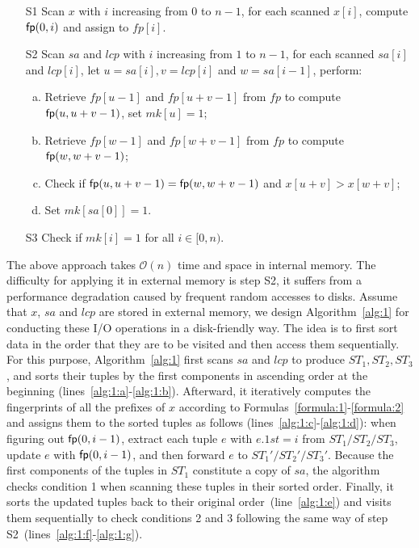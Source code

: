 \documentclass[10pt,journal,compsoc]{IEEEtran}
\begin{document}
\begin{enumerate}
	\item [S1]
	Scan $x$ with $i$ increasing from $0$ to $n - 1$, for each scanned $x[i]$, compute ${\sf fp}(0, i)$ and assign to $fp[i]$.
	
	\item [S2]
	Scan $sa$ and $lcp$ with $i$ increasing from $1$ to $n - 1$, for each scanned $sa[i]$ and $lcp[i]$, let $u = sa[i], v = lcp[i]$ and $w = sa[i - 1]$, perform:
	
	\begin{enumerate}[(a)]
		\item
		Retrieve $fp[u - 1]$ and $fp[u + v - 1]$ from $fp$ to compute ${\sf fp}(u, u + v - 1)$, set $mk[u]=1$;
		
		\item
		Retrieve $fp[w - 1]$ and $fp[w + v - 1]$ from $fp$ to compute ${\sf fp}(w, w + v - 1)$;
		
		\item
		Check if ${\sf fp}(u, u + v - 1) = {\sf fp}(w, w + v - 1)$ and $x[u + v] > x[w + v]$;
		
		\item
		Set $mk[sa[0]] = 1$.
	\end{enumerate}

	\item [S3] Check if $mk[i] = 1$ for all $i \in [0, n)$.
	
\end{enumerate}

The above approach takes $\mathcal{O}(n)$ time and space in internal memory. The difficulty for applying it in external memory is step S2, it suffers from a performance degradation caused by frequent random accesses to disks. Assume that $x$, $sa$ and $lcp$ are stored in external memory, we design Algorithm~\ref{alg:1} for conducting these I/O operations in a disk-friendly way. The idea is to first sort data in the order that they are to be visited and then access them sequentially. For this purpose, Algorithm~\ref{alg:1} first scans $sa$ and $lcp$ to produce $ST_1, ST_2, ST_3$, and sorts their tuples by the first components in ascending order at the beginning (lines~\ref{alg:1:a}-\ref{alg:1:b}). Afterward, it iteratively computes the fingerprints of all the prefixes of $x$ according to Formulas~\ref{formula:1}-\ref{formula:2} and assigns them to the sorted tuples as follows (lines~\ref{alg:1:c}-\ref{alg:1:d}): when figuring out ${\sf fp}(0, i - 1)$, extract each tuple $e$ with $e.1st = i$ from $ST_1/ST_2/ST_3$, update $e$  with ${\sf fp}(0, i - 1)$, and then forward $e$ to $ST_1'/ST_2'/ST_3'$. Because the first components of the tuples in $ST_1$ constitute a copy of $sa$, the algorithm checks condition 1 when scanning these tuples in their sorted order. Finally, it sorts the updated tuples back to their original order~(line~\ref{alg:1:e}) and visits them sequentially to check conditions 2 and 3 following the same way of step S2~(lines~\ref{alg:1:f}-\ref{alg:1:g}).  
\end{document}
